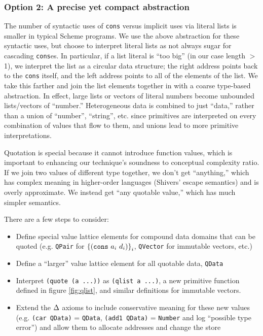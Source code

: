 \documentclass[preprint,onecolumn,9pt]{sigplanconf} %
\begin{document}
\subsubsection{Option 2: A precise yet compact abstraction}

The number of syntactic uses of {\tt cons} versus implicit uses via
literal lists is smaller in typical Scheme programs. We use the above
abstraction for these syntactic uses, but choose to interpret literal
lists as not always sugar for cascading {\tt cons}es. In particular,
if a list literal is ``too big'' (in our case length $>$ 1), we
interpret the list as a circular data structure; the right address
points back to the {\tt cons} itself, and the left address points to
all of the elements of the list. We take this farther and join the
list elements together in with a coarse type-based abstraction. In
effect, large lists or vectors of literal numbers become unbounded
lists/vectors of ``number.'' Heterogeneous data is combined to just
``data,'' rather than a union of ``number'', ``string'', etc. since
primitives are interpreted on every combination of values that flow to
them, and unions lead to more primitive interpretations.

Quotation is special because it cannot introduce function values,
which is important to enhancing our technique's soundness to
conceptual complexity ratio. If we join two values of different type
together, we don't get ``anything,'' which has complex meaning in
higher-order languages (Shivers' escape semantics) and is overly
approximate. We instead get ``any quotable value,'' which has much
simpler semantics.

There are a few steps to consider:
\begin{itemize}
 \item{Define special value lattice elements for compound data domains that can be quoted
       (e.g. {\tt QPair} for $\left\{ ({\tt cons}\ a_i\ d_i)\right\}_i$, {\tt QVector} for immutable vectors, etc.)}
 \item{Define a ``larger'' value lattice element for all quotable data, {\tt QData}}
 \item{Interpret {\tt (quote (a ...))} as {\tt (qlist a ...)}, a new primitive function defined in figure \ref{fig:qlist},
       and similar definitions for immutable vectors.}
 \item{Extend the $\Delta$ axioms to include conservative
   meaning for these new values (e.g. {\tt (car QData)} = {\tt QData},
   {\tt (add1 QData)} = {\tt Number} and log ``possible type error'')
   and allow them to allocate addresses and change the store}
\end{itemize}
\end{document}
